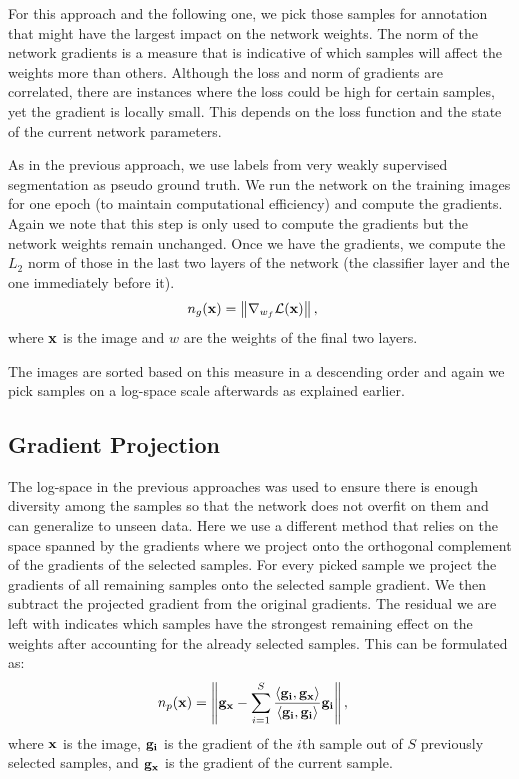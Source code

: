 \documentclass[letterpaper, 10 pt, conference]{ieeeconf}  %
\begin{document}
For this approach and the following one, we pick those samples for annotation that might have the largest impact on the network weights. The norm of the network gradients is a measure that is indicative of which samples will affect the weights more than others. Although the loss and norm of gradients are correlated, there are instances where the loss could be high for certain samples, yet the gradient is locally small. This depends on the loss function and the state of the current network parameters. 

As in the previous approach, we use labels from very weakly supervised segmentation as pseudo ground truth. We run the network on the training images for one epoch (to maintain computational efficiency) and compute the gradients. Again we note that this step is only used to compute the gradients but the network weights remain unchanged. Once we have the gradients, we compute the $L_2$ norm of those in the last two layers of the network (the classifier layer and the one immediately before it).
\begin{align}
n_g(\bold{x}) &=  \left\lVert \nabla_{w_f} \mathcal{L}(\bold{x}) \right\rVert,
\end{align}  
where $\bold{x}$ is the image and $w$ are the weights of the final two layers.

The images are sorted based on this measure in a descending order and again we pick samples on a log-space scale afterwards as explained earlier.

\subsection{Gradient Projection} \label{sec:grad_proj}

The log-space in the previous approaches was used to ensure there is enough diversity among the samples so that the network does not overfit on them and can generalize to unseen data. Here we use a different method that relies on the space spanned by the gradients where we project onto the orthogonal complement of the gradients of the selected samples. For every picked sample we project the gradients of all remaining samples onto the selected sample gradient. We then subtract the projected gradient from the original gradients. The residual we are left with indicates which samples have the strongest remaining effect on the weights after accounting for the already selected samples. This can be formulated as:
\begin{align}
n_p(\bold{x}) &=  \left\lVert \bold{g_x} - \sum_{i=1}^S \frac{\left\langle \bold{g_i}, \bold{g_x} \right\rangle}{\left\langle \bold{g_i}, \bold{g_i} \right\rangle} \bold{g_i} \right\rVert,
\end{align}
where $\bold{x}$ is the image, $\bold{g_i}$ is the gradient of the $i$th sample out of $S$ previously selected samples, and $\bold{g_x}$ is the gradient of the current sample.
\end{document}

